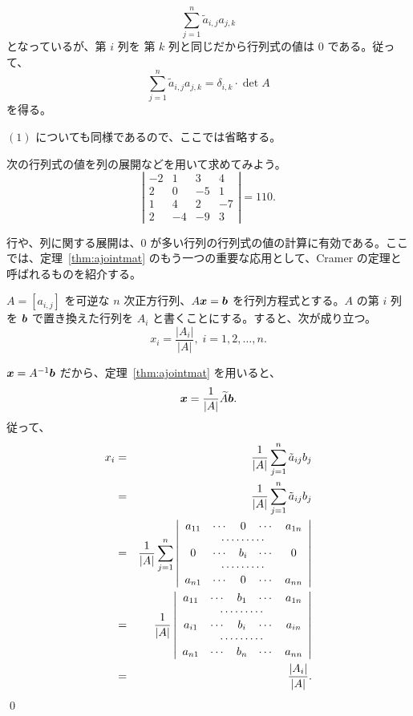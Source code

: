 $$\sum_{j = 1}^n\tilde{a}_{i,j} a_{j,k}$$
となっているが、第 $i$ 列を 第 $k$ 列と同じだから行列式の値は 0 である。従って、
$$\sum_{j = 1}^n\tilde{a}_{i,j} a_{j,k}= \delta_{i,k}\cdot\det A$$
を得る。

$(1)$ についても同様であるので、ここでは省略する。

\begin{eg}
次の行列式の値を列の展開などを用いて求めてみよう。
$$\left|\begin{array}{cccc}-2 & 1 & 3 & 4 \\ 2 & 0 & -5 & 1\\
1 & 4 & 2 & -7\\ 2 & -4 & -9 & 3\end{array}\right| = 110.$$
\end{eg}

\smallskip
行や、列に関する展開は、$0$ が多い行列の行列式の値の計算に有効である。ここでは、定理~\ref{thm:ajointmat} のもう一つの重要な応用として、Cramer の定理と呼ばれるものを紹介する。

\begin{thm} \label{thm:cramer}
$A = [a_{i,j}]$  を可逆な $n$ 次正方行列、$A\mbox{\boldmath $x$} = \mbox{\boldmath $b$}$ を行列方程式とする。$A$ の第 $i$ 列を $\mbox{\boldmath $b$}$ で置き換えた行列を $A_i$ と書くことにする。すると、次が成り立つ。
$$x_i = \frac{|A_i|}{|A|}, \;i = 1,2,\ldots, n.$$
\end{thm}
\proof
$\mbox{\boldmath $x$} = A^{-1}\mbox{\boldmath $b$}$ だから、定理~\ref{thm:ajointmat} を用いると、
$$\mbox{\boldmath $x$} = \frac{1}{|A|}\widetilde{A}\mbox{\boldmath $b$}.$$
従って、
\begin{eqnarray*}
x_i & = & \frac{1}{|A|}\sum_{j=1}^n\tilde{a}_{ij}b_j\\
& = & \frac{1}{|A|}\sum_{j=1}^n\tilde{a}_{ij}b_j\\
& = & \frac{1}{|A|}\sum_{j = 1}^n \left|\begin{array}{ccccc}
a_{11} & \cdots & 0 & \cdots & a_{1n}\\
\multicolumn{5}{c}{\cdots\cdots\cdots}\\
0 & \cdots & b_i & \cdots & 0\\
\multicolumn{5}{c}{\cdots\cdots\cdots}\\
a_{n1} & \cdots & 0 & \cdots & a_{nn}
\end{array}\right|\\
& = & \frac{1}{|A|}\left|\begin{array}{ccccc}
a_{11} & \cdots & b_1 & \cdots & a_{1n}\\
\multicolumn{5}{c}{\cdots\cdots\cdots}\\
a_{i1} & \cdots & b_i & \cdots & a_{in}\\
\multicolumn{5}{c}{\cdots\cdots\cdots}\\
a_{n1} & \cdots & b_n & \cdots & a_{nn}
\end{array}\right|\\
& = & \frac{|A_i|}{|A|}.
\end{eqnarray*}
\qed

